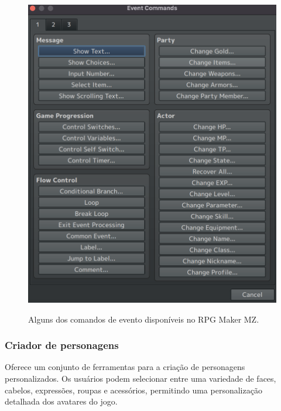 \begin{figure}[ht]
	\centering
	\caption{Alguns dos comandos de evento disponíveis no RPG Maker MZ.}
	\includegraphics[scale=0.3]{Textuais/Pictures/Event-commands-1.png}
	\label{fig:rpgmaker-event-commands-1}
\end{figure}

%

\subsubsection*{Criador de personagens}
Oferece um conjunto de ferramentas para a criação de personagens personalizados. Os usuários podem selecionar entre uma variedade de faces, cabelos, expressões, roupas e acessórios, permitindo uma personalização detalhada dos avatares do jogo.

